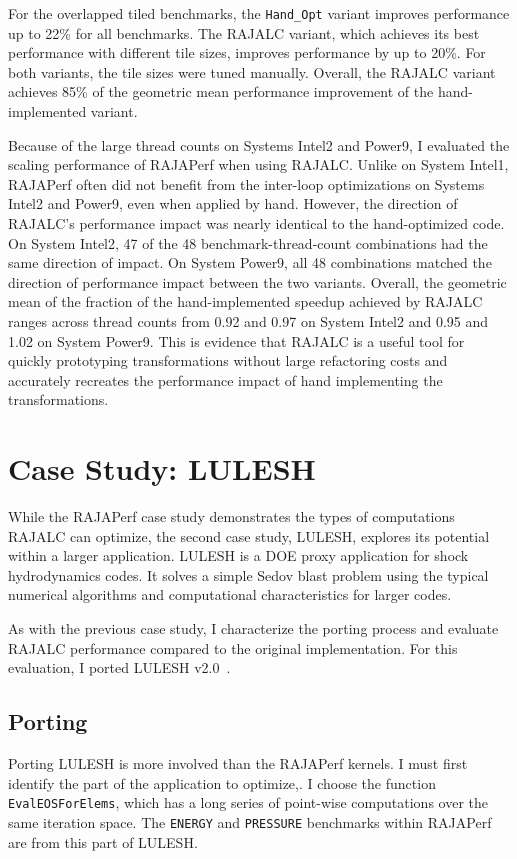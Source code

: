 For the overlapped tiled benchmarks, the \verb.Hand_Opt. variant improves
performance up to 22\% for all benchmarks.
The RAJALC variant, which achieves its best performance with different tile sizes, improves performance by 
up to 20\%.
For both variants, the tile sizes were tuned manually.
Overall, the RAJALC variant achieves 85\% of the geometric mean performance
improvement of the hand-implemented variant. 


Because of the large thread counts on Systems Intel2 and Power9, I evaluated the scaling performance of RAJAPerf when using RAJALC\@.
Unlike on System Intel1, RAJAPerf often did not benefit from the inter-loop
optimizations on Systems Intel2 and Power9, even when applied by hand. 
However, the direction of RAJALC's performance impact was nearly identical to the hand-optimized code. 
On System Intel2, 47 of the 48 benchmark-thread-count combinations had the same direction of impact.
On System Power9, all 48 combinations matched the direction of performance impact between the two variants.
Overall, the geometric mean of the fraction of the hand-implemented speedup achieved by RAJALC ranges across thread counts from 0.92 and 0.97 on System Intel2 and 0.95 and 1.02 on System Power9. 
This is evidence that RAJALC is a useful tool for quickly prototyping transformations without large refactoring costs and accurately recreates the performance impact of hand implementing the transformations.

\section{Case Study: LULESH}

While the RAJAPerf case study demonstrates the types of computations RAJALC
can optimize, the second case study, LULESH, explores its potential within a
larger application.
LULESH is a DOE proxy application for shock hydrodynamics codes.
It solves a simple Sedov blast problem using the typical numerical algorithms and computational characteristics for larger codes.

As with the previous case study, I characterize the porting process and
evaluate RAJALC performance compared to the original implementation.
For this evaluation, I ported LULESH v2.0~\cite{LULESH2}. 

\subsection{Porting}

Porting LULESH is more involved than the RAJAPerf kernels. 
I must first identify the part of the application to optimize,.
I choose the function \verb.EvalEOSForElems., which has a long series
of point-wise computations over the same iteration space.
The \verb.ENERGY. and \verb.PRESSURE. benchmarks within RAJAPerf are
from this part of LULESH\@.

